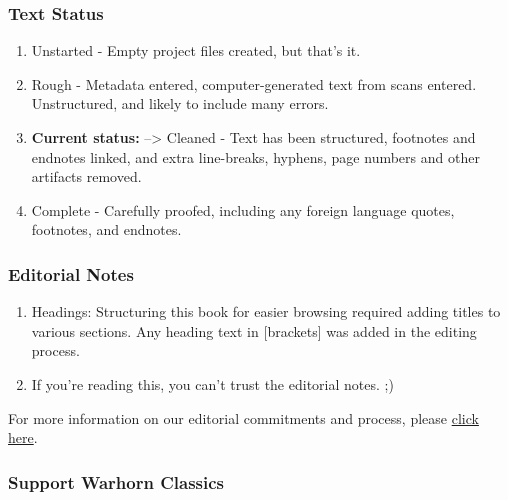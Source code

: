 \documentclass[
]{book}
\providecommand{\tightlist}{%
  \setlength{\itemsep}{0pt}\setlength{\parskip}{0pt}}
\begin{document}
\hypertarget{text-status}{%
\subsubsection*{Text Status}\label{text-status}}

\begin{enumerate}
\def\labelenumi{\arabic{enumi}.}
\setcounter{enumi}{-1}
\tightlist
\item
  Unstarted - Empty project files created, but that's it.
\item
  Rough - Metadata entered, computer-generated text from scans entered. Unstructured, and likely to include many errors.
\item
  \textbf{Current status:} --\textgreater{} Cleaned - Text has been structured, footnotes and endnotes linked, and extra line-breaks, hyphens, page numbers and other artifacts removed.
\item
  Complete - Carefully proofed, including any foreign language quotes, footnotes, and endnotes.
\end{enumerate}

\hypertarget{editorial-notes}{%
\subsubsection*{Editorial Notes}\label{editorial-notes}}

\begin{enumerate}
\def\labelenumi{\arabic{enumi}.}
\tightlist
\item
  Headings: Structuring this book for easier browsing required adding titles to various sections. Any heading text in {[}brackets{]} was added in the editing process.
\item
  If you're reading this, you can't trust the editorial notes. ;)
\end{enumerate}

For more information on our editorial commitments and process, please \href{https://classics.warhornmedia.com/editorial}{click here}.

\hypertarget{support-warhorn-classics}{%
\subsubsection*{Support Warhorn Classics}\label{support-warhorn-classics}}
\end{document}
